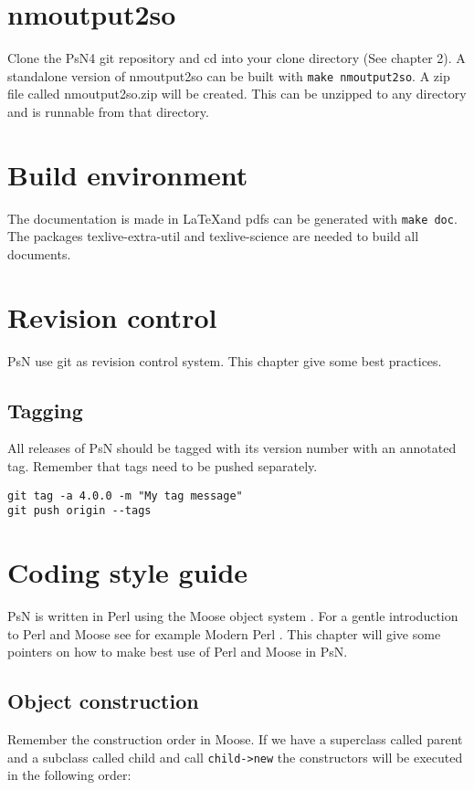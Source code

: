 \section{nmoutput2so}
Clone the PsN4 git repository and cd into your clone directory (See chapter 2). A standalone version of nmoutput2so can be built with \verb|make nmoutput2so|. A zip file called nmoutput2so.zip will be created. This can be unzipped
to any directory and is runnable from that directory.

\section{Build environment}
The documentation is made in \LaTeX and pdfs can be generated with \verb|make doc|. The
packages texlive-extra-util and texlive-science are needed to build all documents.

\section{Revision control}
PsN use git as revision control system. This chapter give some best practices.

\subsection{Tagging}
All releases of PsN should be tagged with its version number with an annotated tag. Remember
that tags need to be pushed separately.
\begin{verbatim}
git tag -a 4.0.0 -m "My tag message"
git push origin --tags
\end{verbatim}

\section{Coding style guide}
PsN is written in Perl using the Moose object system \cite{Moose}. For a gentle introduction to Perl and Moose see for example Modern Perl \cite{modern}. This chapter will give some pointers on how to make best use of Perl and Moose in PsN. 

\subsection{Object construction}

Remember the construction order in Moose. If we have a superclass called parent and a subclass called child and call \verb|child->new| the constructors will be executed in the following order:

